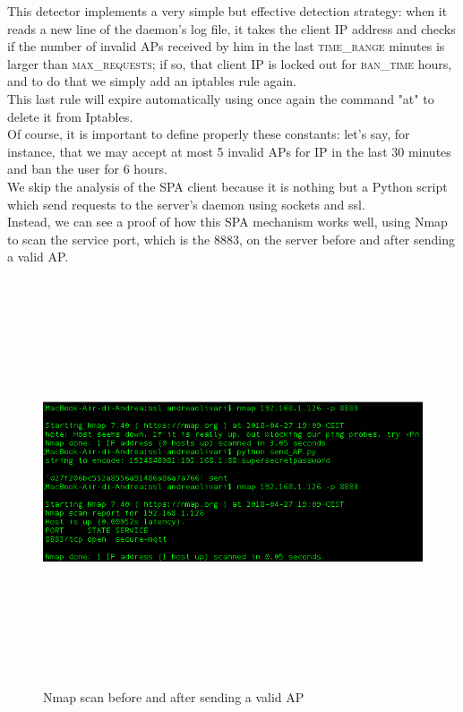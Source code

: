 \documentclass[12pt]{report}
\begin{document}
{This detector implements a very simple but effective detection strategy: when it reads a new line of the daemon's log file, it takes the client IP address and checks if the number of invalid APs received by him in the last \textsc{time\_range} minutes is larger than \textsc{max\_requests}; if so, that client IP is locked out for \textsc{ban\_time} hours, and to do that we simply add an iptables rule again.\\
This last rule will expire automatically using once again the command "at" to delete it from Iptables.\\
Of course, it is important to define properly these constants: let's say, for instance, that we may accept at most 5 invalid APs for IP in the last 30 minutes and ban the user for 6 hours.\\

We skip the analysis of the SPA client because it is nothing but a Python script which send requests to the server's daemon using sockets and ssl.\\

Instead, we can see a proof of how this SPA mechanism works well, using Nmap to scan the service port, which is the 8883, on the server before and after sending a valid AP.

\begin{figure}[H]
\includegraphics[width=13cm,height=12cm,keepaspectratio]{nmap_proof}
\centering
\caption{Nmap scan before and after sending a valid AP}
\end{figure}

}
\end{document}

